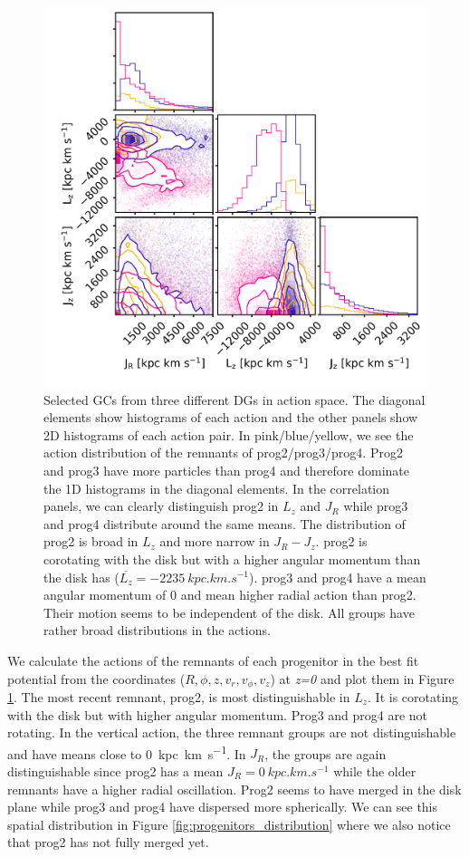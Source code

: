 \begin{figure}[htbp]
\captionsetup{format=plain}
    \centering
    \includegraphics[width=1.0\textwidth]{plots/Dynamics/prog234_GCwodisk_actions_snap_127.png}
    \caption{Selected \acp{GC} from three different \acp{DG} in action space. The diagonal elements show histograms of each action and the other panels show 2D histograms of each action pair. In pink/blue/yellow, we see the action distribution of the remnants of prog2/prog3/prog4. Prog2 and prog3 have more particles than prog4 and therefore dominate the 1D histograms in the diagonal elements. In the correlation panels, we can clearly distinguish prog2 in $L_z$ and $J_R$ while prog3 and prog4 distribute around the same means. The distribution of prog2 is broad in $L_z$ and more narrow in $J_R - J_z$. prog2 is corotating with the disk but with a higher angular momentum than the disk has (\(\overline{L_z} = \SI{-2235}{kpc.km.s^{-1}}\)). prog3 and prog4 have a mean angular momentum of 0 and mean higher radial action than prog2. Their motion seems to be independent of the disk. All groups have rather broad distributions in the actions.}
    \label{fig:act_all_merg_best_pot}
\end{figure}
We calculate the actions of the remnants of each progenitor in the best fit potential from the coordinates ($R, \phi, z, v_r, v_\phi, v_z$) at \textit{z=0} and plot them in Figure \ref{fig:act_all_merg_best_pot}. The most recent remnant, prog2, is most distinguishable in $L_z$. It is corotating with the disk but with higher angular momentum. Prog3 and prog4 are not rotating. In the vertical action, the three remnant groups are not distinguishable and have means close to \SI{0}{kpc.km.s^{-1}}. In $J_R$, the groups are again distinguishable since prog2 has a mean $J_R = \SI{0}{kpc.km.s^{-1}}$ while the older remnants have a higher radial oscillation. Prog2 seems to have merged in the disk plane while prog3 and prog4 have dispersed more spherically. We can see this spatial distribution in Figure \ref{fig:progenitors_distribution} where we also notice that prog2 has not fully merged yet.
